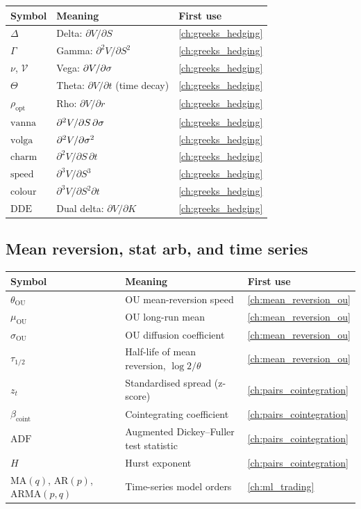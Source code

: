 \begin{longtable}{@{}l >{\raggedright\arraybackslash}p{} l@{}}
\toprule
\textbf{Symbol} & \textbf{Meaning} & \textbf{First use} \\
\midrule
\endhead
$\Delta$ & Delta: $\partial V/\partial S$ & \cref{ch:greeks_hedging} \\
$\Gamma$ & Gamma: $\partial^2 V/\partial S^2$ & \cref{ch:greeks_hedging} \\
$\nu$, $\mathcal{V}$ & Vega: $\partial V/\partial \sigma$ & \cref{ch:greeks_hedging} \\
$\Theta$ & Theta: $\partial V/\partial t$ (time decay) & \cref{ch:greeks_hedging} \\
$\rho_{\text{opt}}$ & Rho: $\partial V/\partial r$ & \cref{ch:greeks_hedging} \\
$\text{vanna}$ & $\partial^2 V/\partial S\,\partial\sigma$ & \cref{ch:greeks_hedging} \\
$\text{volga}$ & $\partial^2 V/\partial\sigma^2$ & \cref{ch:greeks_hedging} \\
$\text{charm}$ & $\partial^2 V/\partial S\,\partial t$ & \cref{ch:greeks_hedging} \\
$\text{speed}$ & $\partial^3 V/\partial S^3$ & \cref{ch:greeks_hedging} \\
$\text{colour}$ & $\partial^3 V/\partial S^2 \partial t$ & \cref{ch:greeks_hedging} \\
$\text{DDE}$ & Dual delta: $\partial V/\partial K$ & \cref{ch:greeks_hedging} \\
\bottomrule
\end{longtable}

\subsection{Mean reversion, stat arb, and time series}

\begin{longtable}{@{}l >{\raggedright\arraybackslash}p{} l@{}}
\toprule
\textbf{Symbol} & \textbf{Meaning} & \textbf{First use} \\
\midrule
\endhead
$\theta_{\text{OU}}$ & OU mean-reversion speed & \cref{ch:mean_reversion_ou} \\
$\mu_{\text{OU}}$ & OU long-run mean & \cref{ch:mean_reversion_ou} \\
$\sigma_{\text{OU}}$ & OU diffusion coefficient & \cref{ch:mean_reversion_ou} \\
$\tau_{1/2}$ & Half-life of mean reversion, $\log 2/\theta$ & \cref{ch:mean_reversion_ou} \\
$z_t$ & Standardised spread (z-score) & \cref{ch:pairs_cointegration} \\
$\beta_{\text{coint}}$ & Cointegrating coefficient & \cref{ch:pairs_cointegration} \\
$\text{ADF}$ & Augmented Dickey--Fuller test statistic & \cref{ch:pairs_cointegration} \\
$H$ & Hurst exponent & \cref{ch:pairs_cointegration} \\
$\text{MA}(q)$, $\text{AR}(p)$, $\text{ARMA}(p,q)$ & Time-series model orders & \cref{ch:ml_trading} \\
\bottomrule
\end{longtable}

